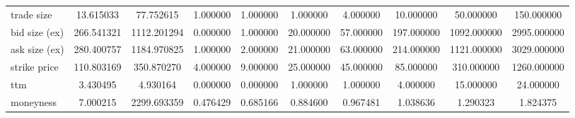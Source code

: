 \begin{table}[!ht]
\begin{tabular}{@{}lSSSSSSSSS@{}}
        trade size           & 13.615033                        & 77.752615   & 1.000000 & 1.000000 & 1.000000  & 4.000000  & 10.000000  & 50.000000   & 150.000000  \\
        bid size (ex)        & 266.541321                       & 1112.201294 & 0.000000 & 1.000000 & 20.000000 & 57.000000 & 197.000000 & 1092.000000 & 2995.000000 \\
        ask size (ex)        & 280.400757                       & 1184.970825 & 1.000000 & 2.000000 & 21.000000 & 63.000000 & 214.000000 & 1121.000000 & 3029.000000 \\
        strike price         & 110.803169                       & 350.870270  & 4.000000 & 9.000000 & 25.000000 & 45.000000 & 85.000000  & 310.000000  & 1260.000000 \\
        ttm                  & 3.430495                         & 4.930164    & 0.000000 & 0.000000 & 1.000000  & 1.000000  & 4.000000   & 15.000000   & 24.000000   \\
        moneyness            & 7.000215                         & 2299.693359 & 0.476429 & 0.685166 & 0.884600  & 0.967481  & 1.038636   & 1.290323    & 1.824375    \\
        \bottomrule
    \end{tabular}
\end{table}
